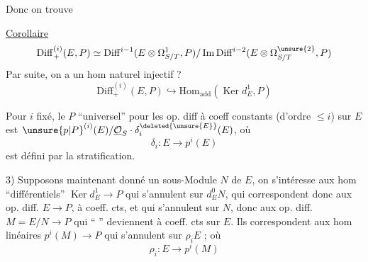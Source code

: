Donc on trouve

\uline{Corollaire}
\[
 \mathrm{Diff}^{(i)}_+(E,P)\simeq
 \mathrm{Diff}^{i-1}(E\otimes\Omega^1_{S/T},P)/
 \operatorname{Im}\mathrm{Diff}^{i-2}(E\otimes\Omega^{\unsure{2}}_{S/T},P)
\]
Par suite, on a un hom naturel injectif \textcircled{?}
\[
 \mathrm{Diff}^{(i)}_+(E,P)\hookrightarrow
 \mathrm{Hom}_{\mathrm{add}}(\operatorname{Ker}d_E^1,P)
\]

Pour $i$ fixé, le $P$ ``universel'' pour les op. diff à coeff constants (d'ordre $\leq i$) sur $E$ est $\unsure{p|P}^{(i)}(E)/\underline{\mathcal O}_S\cdot\delta_i^{\deleted{\unsure{E}}}(E)$, où
\[
 \delta_i:E\longrightarrow p^i(E)
\]
est défini par la stratification.

3) Supposons maintenant donné un sous-Module $N$ de $E$, on s'intéresse aux hom ``différentiels'' $\operatorname{Ker}d_E^1\longrightarrow P$ qui s'annulent sur $d_E^0 N$, qui correspondent donc aux  op. diff. $E\longrightarrow P$, à coeff. cts, et qui s'annulent sur $N$, donc aux op. diff. $M=E/N\longrightarrow P$ qui `` '' deviennent à coeff. cts sur $E$. Ils correspondent  aux hom linéaires $p^i(M)\longrightarrow P$ qui s'annulent sur $\rho_i E$ ; où
\[
 \rho_i:E\longrightarrow p^i(M)
\]
